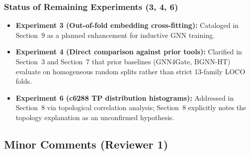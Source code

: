 \documentclass[11pt,a4paper]{article}
\begin{document}
\subsubsection*{Status of Remaining Experiments (3, 4, 6)}
\begin{itemize}[leftmargin=*]
    \item \textbf{Experiment 3 (Out-of-fold embedding cross-fitting):} Cataloged in Section~9 as a planned enhancement for inductive GNN training.
    \item \textbf{Experiment 4 (Direct comparison against prior tools):} Clarified in Section~3 and Section~7 that prior baselines (GNN4Gate, BGNN-HT) evaluate on homogeneous random splits rather than strict 13-family LOCO folds.
    \item \textbf{Experiment 6 (c6288 TP distribution histograms):} Addressed in Section~8 via topological correlation analysis; Section~8 explicitly notes the topology explanation as an unconfirmed hypothesis.
\end{itemize}

\subsection*{Minor Comments (Reviewer 1)}
\end{document}
